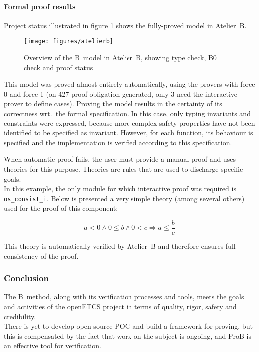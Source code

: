 \paragraph{Formal proof results}
\label{subapp:proof}

Project status illustrated in figure \ref{fig:atelierb} shows the fully-proved model in Atelier~B. 

\begin{figure}[h!]
\centering
\texttt{[image: figures/atelierb]}
\caption{Overview of the B~model in Atelier~B, showing type check, B0 check and proof status}
\label{fig:atelierb}
\end{figure}

This model was proved almost entirely automatically, using the provers with
force 0 and force 1 (on 427 proof obligation generated, only 3 need the
interactive prover to define cases). Proving the model results in the certainty
of its correctness wrt.\ the formal specification. In this case, only typing
invariants and constraints were expressed, because more complex safety
properties have not been identified to be specified as invariant. However, for each function, its behaviour is specified and the implementation is verified according to this specification.

When automatic proof fails, the user must provide a manual proof and uses theories for this purpose. Theories are rules that are used to discharge specific goals.\\
In this example, the only module for which interactive proof was required is \verb+os_consist_i+. Below is presented a very simple theory (among several others) used for the proof of this component:

\begin{equation}
\tag{User theory 1}
a < 0 \land 0 \leq b \land 0 < c \Rightarrow a \leq \frac{b}{c}
\end{equation}

This theory is automatically verified by Atelier~B and therefore ensures full consistency of the proof.


\subsubsection{Conclusion}
The B~method, along with its verification processes and tools, meets the goals and activities of the openETCS project in terms of quality, rigor, safety and credibility.\\
There is yet to develop open-source POG and build a framework for proving, but this is compensated by the fact that work on the subject is ongoing, and ProB is an effective tool for verification.

